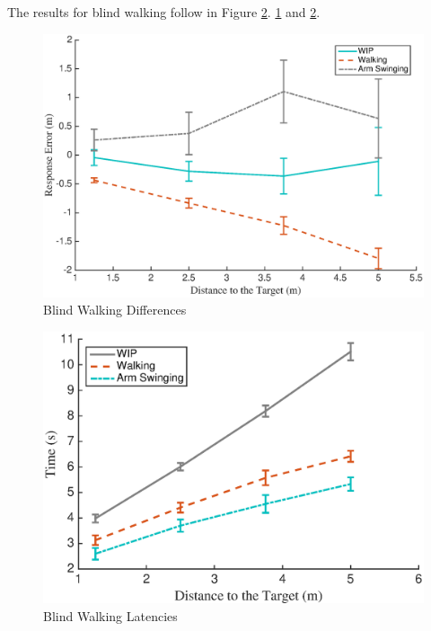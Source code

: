 \documentclass[titlepage]{article}
\theoremstyle{definition}
\theoremstyle{proof}
\begin{document}
\clearpage
The results for blind walking follow in Figure \ref{fig:blind-walking-latencies}.
\ref{fig:blind-walking-differences} and \ref{fig:blind-walking-latencies}.
\begin{figure}[h]
  \centering
  \includegraphics[scale=.35]{figures/blind_walking.eps}
  \caption{Blind Walking Differences}
  \label{fig:blind-walking-differences}
\end{figure}
\begin{figure}[h]
  \centering
  \includegraphics[scale=.45]{figures/blind_walking_latency.eps}
  \caption{Blind Walking Latencies}
  \label{fig:blind-walking-latencies}
\end{figure}
\end{document}

